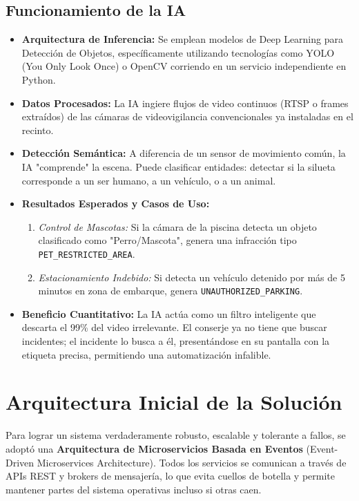 \documentclass[12pt,a4paper]{article}
\begin{document}
\subsection{Funcionamiento de la IA}
\begin{itemize}
    \item \textbf{Arquitectura de Inferencia:} Se emplean modelos de Deep Learning para Detección de Objetos, específicamente utilizando tecnologías como YOLO (You Only Look Once) o OpenCV corriendo en un servicio independiente en Python.
    \item \textbf{Datos Procesados:} La IA ingiere flujos de video continuos (RTSP o frames extraídos) de las cámaras de videovigilancia convencionales ya instaladas en el recinto.
    \item \textbf{Detección Semántica:} A diferencia de un sensor de movimiento común, la IA "comprende" la escena. Puede clasificar entidades: detectar si la silueta corresponde a un ser humano, a un vehículo, o a un animal. 
    \item \textbf{Resultados Esperados y Casos de Uso:} 
    \begin{enumerate}
        \item \textit{Control de Mascotas:} Si la cámara de la piscina detecta un objeto clasificado como "Perro/Mascota", genera una infracción tipo \texttt{PET\_RESTRICTED\_AREA}.
        \item \textit{Estacionamiento Indebido:} Si detecta un vehículo detenido por más de 5 minutos en zona de embarque, genera \texttt{UNAUTHORIZED\_PARKING}.
    \end{enumerate}
    \item \textbf{Beneficio Cuantitativo:} La IA actúa como un filtro inteligente que descarta el 99\% del video irrelevante. El conserje ya no tiene que buscar incidentes; el incidente lo busca a él, presentándose en su pantalla con la etiqueta precisa, permitiendo una automatización infalible.
\end{itemize}

\section{Arquitectura Inicial de la Solución}
Para lograr un sistema verdaderamente robusto, escalable y tolerante a fallos, se adoptó una \textbf{Arquitectura de Microservicios Basada en Eventos} (Event-Driven Microservices Architecture). Todos los servicios se comunican a través de APIs REST y brokers de mensajería, lo que evita cuellos de botella y permite mantener partes del sistema operativas incluso si otras caen.
\end{document}
